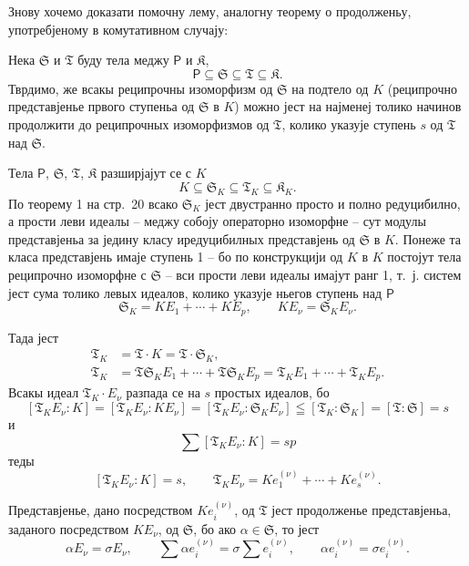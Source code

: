 \documentclass[11pt]{article}
\begin{document}
Знову хочемо доказати помочну лему, аналогну теорему о продолженьу, употребјеному в комутативном случају:

Нека \(\mathfrak S\) и \(\mathfrak T\) буду тела меджу \(\mathsf P\) и \(\mathfrak K\),
\[
\mathsf P \subseteq \mathfrak S \subseteq \mathfrak T \subseteq \mathfrak K.
\]
Тврдимо, же всакы реципрочны изоморфизм од \(\mathfrak S\) на подтело од \(K\) (реципрочно представјенье првого ступеньа од \(\mathfrak S\) в \(K\)) можно јест на најменеј толико начинов продолжити до реципрочных изоморфизмов од \(\mathfrak T\), колико указује ступень \(s\) од \(\mathfrak T\) над \(\mathfrak S\).

Тела \(\mathsf P\), \(\mathfrak S\), \(\mathfrak T\), \(\mathfrak K\) разширјајут се с \(K\)
\[
K\subseteq \mathfrak S_K\subseteq \mathfrak T_K\subseteq \mathfrak K_K.
\]
По теорему 1 на стр.~20 всако \(\mathfrak S_K\) јест двустранно просто и полно редуцибилно, а прости леви идеалы -- меджу собоју операторно изоморфне -- сут модулы представјеньа за једину класу иредуцибилных представјень од \(\mathfrak S\) в \(K\). Понеже та класа представјень имаје ступень 1 -- бо по конструкцији од \(K\) в \(K\) постојут тела реципрочно изоморфне с \(\mathfrak S\) -- вси прости леви идеалы имајут ранг 1, т.~ј. систем јест сума толико левых идеалов, колико указује ньегов ступень над \(\mathsf P\)
\[
\mathfrak S_K=K E_1+\cdots+K E_p,\qquad K E_\nu=\mathfrak S_K E_\nu.
\]

Тада јест
\[
\begin{aligned}
\mathfrak T_K&=\mathfrak T\cdot K=\mathfrak T\cdot \mathfrak S_K,\\
\mathfrak T_K&=\mathfrak T\mathfrak S_K E_1+\cdots+\mathfrak T\mathfrak S_K E_p
              =\mathfrak T_K E_1+\cdots+\mathfrak T_K E_p.
\end{aligned}
\]
Всакы идеал \(\mathfrak T_K\cdot E_\nu\) разпада се на \(s\) простых идеалов, бо
\[
[\mathfrak T_K E_\nu:K]=[\mathfrak T_K E_\nu:K E_\nu]=[\mathfrak T_K E_\nu:\mathfrak S_K E_\nu]\leqq[\mathfrak T_K:\mathfrak S_K]=[\mathfrak T:\mathfrak S]=s
\]
и
\[
\sum [\mathfrak T_K E_\nu:K]=sp
\]
теды
\[
[\mathfrak T_K E_\nu:K]=s,
\qquad
\mathfrak T_K E_\nu=K e_1^{(\nu)}+\cdots+K e_s^{(\nu)}.
\]

Представјенье, дано посредством \(K e_i^{(\nu)}\), од \(\mathfrak T\) јест продолженье представјеньа, заданого посредством \(K E_\nu\), од \(\mathfrak S\), бо ако \(\alpha\in \mathfrak S\), то јест
\[
\alpha E_\nu=\sigma E_\nu,\qquad
\sum \alpha e_i^{(\nu)}=\sigma\sum e_i^{(\nu)},\qquad
\alpha e_i^{(\nu)}=\sigma e_i^{(\nu)}.
\]
\end{document}
